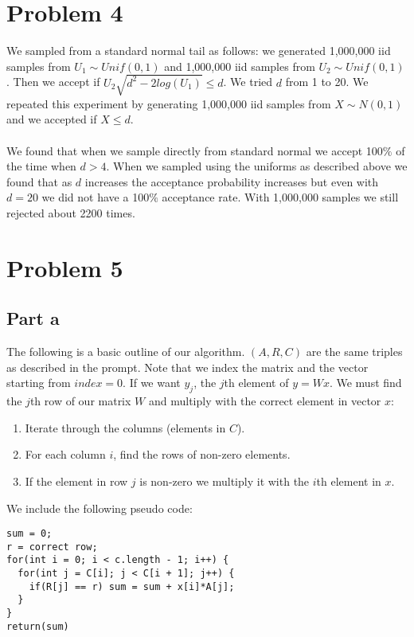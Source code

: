 \documentclass{article}\usepackage[]{graphicx}\usepackage[]{color}
\begin{document}
\section*{Problem 4}


We sampled from a standard normal tail as follows: we generated 1,000,000 iid samples from $U_1 \sim Unif(0,1)$ and 1,000,000 iid samples from $U_2 \sim Unif(0,1)$.  Then we accept if $U_2 \sqrt{d^2 - 2log(U_1)} \le d$.  We tried $d$ from 1 to 20.  We repeated this experiment by generating 1,000,000 iid samples from $X \sim N(0,1)$ and we accepted if $X \le d$.  \\
\\
We found that when we sample directly from standard normal we accept 100$\%$ of the time when $d > 4$.  When we sampled using the uniforms as described above we found that as $d$ increases the acceptance probability increases but even with $d = 20$ we did not have a 100$\%$ acceptance rate.  With 1,000,000 samples we still rejected about 2200 times.

\section*{Problem 5}
\subsection*{Part a}
The following is a basic outline of our algorithm.  $(A,R,C)$ are the same triples as described in the prompt.  Note that we index the matrix and the vector starting from $index = 0$.  If we want $y_j$, the $j$th element of $y = Wx$.  We must find the $j$th row of our matrix $W$ and multiply with the correct element in vector $x$:
\begin{enumerate}
\item Iterate through the columns (elements in $C$).
\item For each column $i$, find the rows of non-zero elements.
\item If the element in row $j$ is non-zero we multiply it with the $i$th element in $x$.
\end{enumerate}
We include the following pseudo code:
\begin{verbatim}
sum = 0;
r = correct row;
for(int i = 0; i < c.length - 1; i++) {
  for(int j = C[i]; j < C[i + 1]; j++) {
    if(R[j] == r) sum = sum + x[i]*A[j];
  }
}
return(sum)
\end{verbatim}
\end{document}

